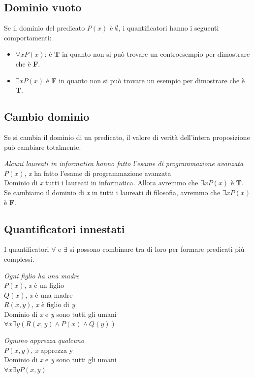 \subsection{Dominio vuoto}
Se il dominio del predicato $P(x)$ è $\emptyset$, i quantificatori hanno i seguenti comportamenti: 
\begin{itemize}
    \item $\forall xP(x)$: è \textbf{T} in quanto non si può trovare un controesempio per dimostrare che è \textbf{F}.
    \item $\exists xP(x)$ è \textbf{F} in quanto non si può trovare un esempio per dimostrare che è \textbf{T}.
\end{itemize}

\subsection{Cambio dominio}
Se si cambia il dominio di un predicato, il valore di verità dell'intera proposizione può cambiare totalmente.
\begin{example}
\emph{Alcuni laureati in informatica hanno fatto l'esame di programmazione avanzata} \\
$P(x)$, \textit{x} ha fatto l'esame di programmazione avanzata \\
Dominio di \textit{x} tutti i laureati in informatica.
Allora avremmo che $\exists xP(x)$ è \textbf{T}. \\
Se cambiamo il dominio di \textit{x} in tutti i laureati di filosofia, avremmo che  $\exists xP(x)$ è \textbf{F}.
\end{example}

\subsection{Quantificatori innestati}
I quantificatori $\forall$ e $\exists$ si possono combinare tra di loro per formare predicati più complessi.
\begin{example}
\emph{Ogni figlio ha una madre} \\
$P(x)$, \textit{x} è un figlio \\
$Q(x)$, \textit{x} è una madre \\
$R(x, y)$, \textit{x} è figlio di \textit{y} \\
Dominio di \textit{x} e \textit{y} sono tutti gli umani \\
$\forall x \exists y (R(x, y) \wedge P(x) \wedge Q(y))$
\end{example}
\begin{example}
\emph{Ognuno apprezza qualcuno} \\
$P(x, y)$, \textit{x} apprezza y \\
Dominio di \textit{x} e \textit{y} sono tutti gli umani \\
$\forall x \exists y P(x, y)$
\end{example}

